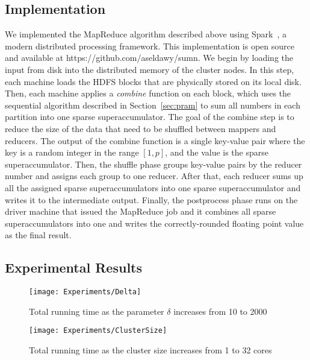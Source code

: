 \documentclass[11pt]{article}
\begin{document}
\subsection{Implementation}
We implemented the MapReduce algorithm described above using
Spark~\cite{ZCF+10}, a modern distributed processing framework.
This implementation is open source and available at https://github.com/aseldawy/sumn.
We begin by loading the input from disk into the distributed memory
of the cluster nodes. In this step, each machine loads the HDFS
blocks that are physically stored on its local disk. Then, each
machine applies a {\em combine} function on each block, which uses
the sequential algorithm described in Section~\ref{sec:pram} to sum
all numbers in each partition into one sparse superaccumulator. The
goal of the combine step is to reduce the size of the data that
need to be shuffled between mappers and reducers. The output of the
combine function is a single key-value pair where the key is a
random integer in the range $[1, p]$, and the value is the sparse
superaccumulator.  Then, the shuffle phase groups key-value pairs
by the reducer number and assigns each group to one reducer.  After
that, each reducer sums up all the assigned sparse superaccumulators
into one sparse superaccumulator and writes it to the intermediate
output. Finally, the postprocess phase runs on the driver machine
that issued the MapReduce job and it combines all sparse superaccumulators
into one and writes the correctly-rounded floating point value as
the final result.

\subsection{Experimental Results}


\begin{figure*}[t]
	\centering
		\texttt{[image: Experiments/Delta]}
	\caption{Total running time as the parameter $\delta$ increases from 10 to 2000}
	\label{fig:Delta}
\end{figure*}



\begin{figure*}[t]
	\centering
		\texttt{[image: Experiments/ClusterSize]}
	\caption{Total running time as the cluster size increases from 1 to 32 cores}
	\label{fig:ClusterSize}
\end{figure*}
\end{document}
